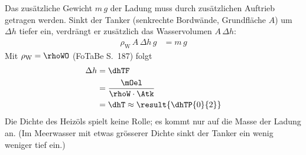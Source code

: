 Das zusätzliche Gewicht $m\,g$ der Ladung muss durch zusätzlichen Auftrieb getragen werden. Sinkt der Tanker (senkrechte Bordwände, Grundfläche $A$) um $\Delta h$ tiefer ein, verdrängt er zusätzlich das Wasservolumen $A\,\Delta h$:
\begin{align}
 \rho_\text{W}\,A\,\Delta h\,g &= m\,g
\end{align}
Mit $\rho_\text{W} = \rhoWO$ (FoTaBe S.~187) folgt
\begin{align}
 \Delta h &= \dhTF \\
   &= \frac{\mOel}{\rhoW\cdot\Atk} \\
   &= \dhT \approx \result{\dhTP{0}{2}}
\end{align}
Die Dichte des Heizöls spielt keine Rolle; es kommt nur auf die Masse der Ladung an. (Im Meerwasser mit etwas grösserer Dichte sinkt der Tanker ein wenig weniger tief ein.)
